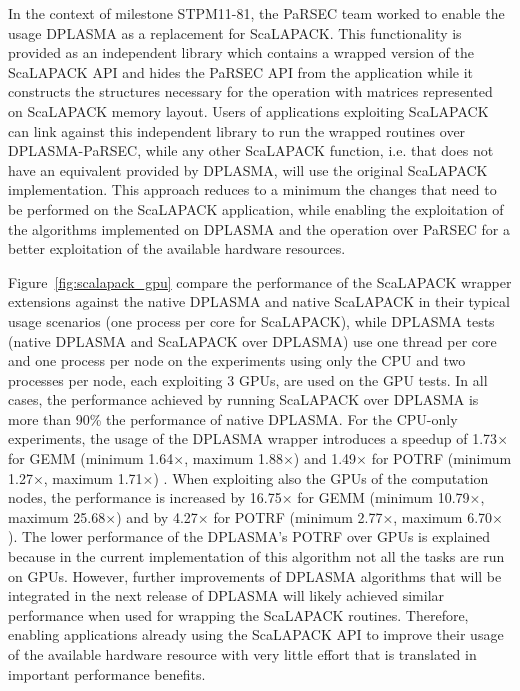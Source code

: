 In the context of milestone STPM11-81, the PaRSEC team worked to
enable the usage DPLASMA as a replacement for ScaLAPACK.  This
functionality is provided as an independent library which contains a
wrapped version of the ScaLAPACK API and hides the PaRSEC API from the
application while it constructs the structures necessary for the
operation with matrices represented on ScaLAPACK memory layout.  Users
of applications exploiting ScaLAPACK can link against this independent
library to run the wrapped routines over DPLASMA-PaRSEC, while any
other ScaLAPACK function, i.e. that does not have an equivalent
provided by DPLASMA, will use the original ScaLAPACK implementation.
This approach reduces to a minimum the changes that need to be
performed on the ScaLAPACK application, while enabling the
exploitation of the algorithms implemented on DPLASMA and the
operation over PaRSEC for a better exploitation of the available
hardware resources.


Figure~\ref{fig:scalapack_gpu} compare the
performance of the ScaLAPACK wrapper extensions against the native
DPLASMA and native ScaLAPACK in their typical usage scenarios (one
process per core for ScaLAPACK),
while DPLASMA tests (native DPLASMA and ScaLAPACK over DPLASMA) use
one thread per core and one process per node on the experiments using
only the CPU and two processes per node, each exploiting 3 GPUs, are
used on the GPU tests.
%
In all cases, the performance achieved by running ScaLAPACK over
DPLASMA is more than 90\% the performance of native DPLASMA.  For the
CPU-only experiments, the usage of the DPLASMA wrapper introduces a
speedup of 1.73$\times$ for GEMM (minimum 1.64$\times$, maximum 1.88$\times$) and 1.49$\times$ for
POTRF (minimum 1.27$\times$, maximum 1.71$\times$) .  When exploiting also the GPUs
of the computation nodes, the performance is increased by 16.75$\times$ for
GEMM (minimum 10.79$\times$, maximum 25.68$\times$) and by 4.27$\times$ for POTRF (minimum
2.77$\times$, maximum 6.70$\times$).  The lower performance of the DPLASMA's POTRF
over GPUs is explained because in the current implementation of this
algorithm not all the tasks are run on GPUs. However, further
improvements of DPLASMA algorithms that will be integrated in the next
release of DPLASMA will likely achieved similar performance when used
for wrapping the ScaLAPACK routines. Therefore, enabling applications
already using the ScaLAPACK API to improve their usage of the
available hardware resource with very little effort that is translated
in important performance benefits.

